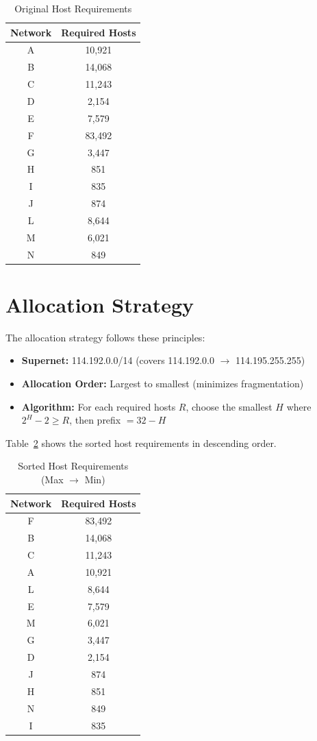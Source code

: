 \documentclass[12pt,a4paper]{report}
\begin{document}
\begin{table}[H]
\centering
\caption{Original Host Requirements}
\label{tab:host-requirements}
\begin{tabular}{@{}cc@{}}
\toprule
\textbf{Network} & \textbf{Required Hosts} \\
\midrule
A & 10,921 \\
B & 14,068 \\
C & 11,243 \\
D & 2,154 \\
E & 7,579 \\
F & 83,492 \\
G & 3,447 \\
H & 851 \\
I & 835 \\
J & 874 \\
L & 8,644 \\
M & 6,021 \\
N & 849 \\
\bottomrule
\end{tabular}
\end{table}

\section{Allocation Strategy}

The allocation strategy follows these principles:

\begin{itemize}
    \item \textbf{Supernet:} 114.192.0.0/14 (covers 114.192.0.0 $\rightarrow$ 114.195.255.255)
    \item \textbf{Allocation Order:} Largest to smallest (minimizes fragmentation)
    \item \textbf{Algorithm:} For each required hosts $R$, choose the smallest $H$ where $2^H - 2 \geq R$, then prefix $= 32 - H$
\end{itemize}

Table~\ref{tab:sorted-requirements} shows the sorted host requirements in descending order.

\begin{table}[H]
\centering
\caption{Sorted Host Requirements (Max $\rightarrow$ Min)}
\label{tab:sorted-requirements}
\begin{tabular}{@{}cc@{}}
\toprule
\textbf{Network} & \textbf{Required Hosts} \\
\midrule
F & 83,492 \\
B & 14,068 \\
C & 11,243 \\
A & 10,921 \\
L & 8,644 \\
E & 7,579 \\
M & 6,021 \\
G & 3,447 \\
D & 2,154 \\
J & 874 \\
H & 851 \\
N & 849 \\
I & 835 \\
\bottomrule
\end{tabular}
\end{table}
\end{document}
